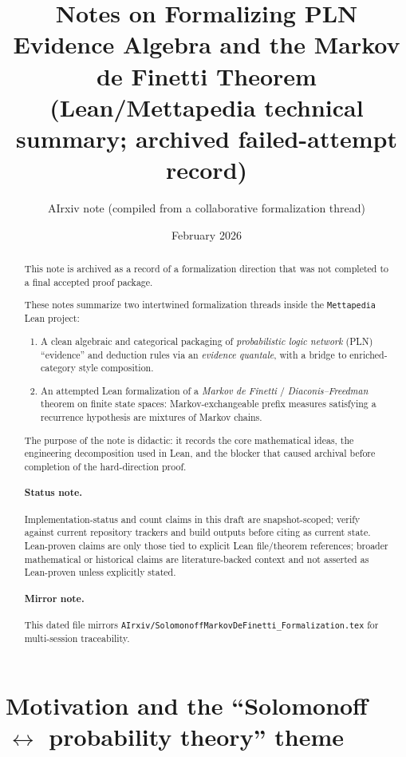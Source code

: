 \documentclass[11pt]{article}
\title{Notes on Formalizing PLN Evidence Algebra and the Markov de Finetti Theorem\\
\large (Lean/Mettapedia technical summary; archived failed-attempt record)}
\author{AIrxiv note (compiled from a collaborative formalization thread)}
\date{February 2026}
\newcommand{\1}{\mathbf{1}}
\begin{document}
\maketitle

\begin{abstract}
This note is archived as a record of a formalization direction that was not completed
to a final accepted proof package.

These notes summarize two intertwined formalization threads inside the \texttt{Mettapedia} Lean project:

\begin{enumerate}[leftmargin=2em]
\item A clean algebraic and categorical packaging of \emph{probabilistic logic network} (PLN) ``evidence'' and deduction rules via an \emph{evidence quantale}, with a bridge to enriched-category style composition.
\item An attempted Lean formalization of a \emph{Markov de Finetti} / \emph{Diaconis--Freedman} theorem on finite state spaces: Markov-exchangeable prefix measures satisfying a recurrence hypothesis are mixtures of Markov chains.
\end{enumerate}

The purpose of the note is didactic: it records the core mathematical ideas,
the engineering decomposition used in Lean, and the blocker that caused archival
before completion of the hard-direction proof.
\paragraph{Status note.} Implementation-status and count claims in this draft are snapshot-scoped; verify against current repository trackers and build outputs before citing as current state. Lean-proven claims are only those tied to explicit Lean file/theorem references; broader mathematical or historical claims are literature-backed context and not asserted as Lean-proven unless explicitly stated.
\paragraph{Mirror note.} This dated file mirrors \texttt{AIrxiv/SolomonoffMarkovDeFinetti\_Formalization.tex} for multi-session traceability.
\end{abstract}

\tableofcontents

\section{Motivation and the ``Solomonoff $\leftrightarrow$ probability theory'' theme}
\end{document}
